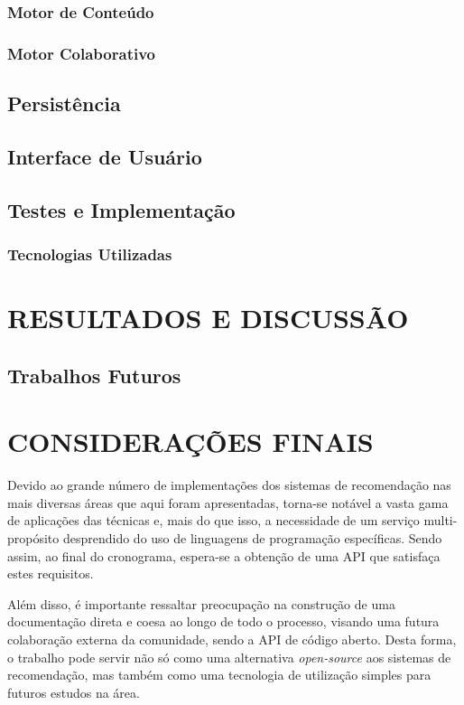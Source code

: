 \documentclass[12pt, openright, oneside, a4paper, brazil]{abntex2}
\begin{document}
\subsection{Motor de Conteúdo} \label{motor:conteudo}

\subsection{Motor Colaborativo} \label{motor:colaborativo}

\section{Persistência} \label{persistencia}

\section{Interface de Usuário} \label{interface}

\section{Testes e Implementação} \label{testes}

\subsection{Tecnologias Utilizadas} \label{tecnologias}

%
%

\chapter{RESULTADOS E DISCUSSÃO}

\section{Trabalhos Futuros} \label{trabalhos_futuros}

\chapter{CONSIDERAÇÕES FINAIS}

Devido ao grande número de implementações dos sistemas de recomendação nas mais diversas áreas que aqui foram apresentadas, torna-se notável a vasta gama de aplicações das técnicas e, mais do que isso, a necessidade de um serviço multi-propósito desprendido do uso de linguagens de programação específicas. Sendo assim, ao final do cronograma, espera-se a obtenção de uma API que satisfaça estes requisitos.

Além disso, é importante ressaltar preocupação na construção de uma documentação direta e coesa ao longo de todo o processo, visando uma futura colaboração externa da comunidade, sendo a API de código aberto. Desta forma, o trabalho pode servir não só como uma alternativa \textit{open-source} aos sistemas de recomendação, mas também como uma tecnologia de utilização simples para futuros estudos na área.

\postextual

\end{document}
